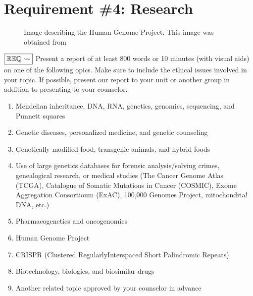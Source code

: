 \documentclass[letterpaper,10pt,english,openany,oneside]{sphinxmanual}
\let\sphinxpxdimen\pdfpxdimen\else\newdimen\sphinxpxdimen
\begin{document}
\chapter{Requirement \#4: Research}
\label{\detokenize{requirement4:requirement-4-research}}\label{\detokenize{requirement4::doc}}
\begin{figure}[htbp]
\centering
\capstart

\noindent\sphinxincludegraphics[width=500\sphinxpxdimen]{{dnalife}.jpg}
\caption{Image describing the Human Genome Project. This image was obtained from }\label{\detokenize{requirement4:id1}}\end{figure}

\(\boxed{\mathbb{REQ}\Large \rightsquigarrow}\) Present a report of at least 800 words or 10 minutes (with visual aids) on one of the following opics. Make sure to include the ethical issues involved in your topic. If possible, present our report to your unit or another group in addition to presenting to your counselor.
\begin{enumerate}
%
\item {} 
Mendelian inheritance, DNA, RNA, genetics, genomics, sequencing, and Punnett squares

\item {} 
Genetic diseases, personalized medicine, and genetic counseling

\item {} 
Genetically modified food, transgenic animals, and hybrid foods

\item {} 
Use of large genetics databases for forensic analysis/solving crimes, genealogical research, or medical studies (The Cancer Genome Atlas (TCGA), Catalogue of Somatic Mutations in Cancer (COSMIC), Exome Aggregation Consortioum (ExAC), 100,000 Genomes Project, mitochondria! DNA, etc.)

\item {} 
Pharmacogenetics and oncogenomics

\item {} 
Human Genome Project

\item {} 
CRISPR (Clustered Regularly\sphinxhyphen{}Interspaced Short Palindromic Repeats)

\item {} 
Biotechnology, biologics, and biosimilar drugs

\item {} 
Another related topic approved by your counselor in advance

\end{enumerate}
\end{document}
